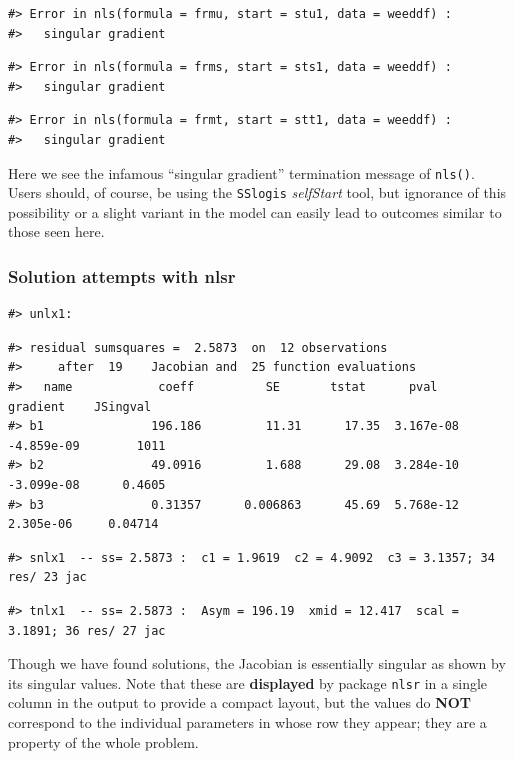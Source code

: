 \begin{verbatim}
#> Error in nls(formula = frmu, start = stu1, data = weeddf) : 
#>   singular gradient
\end{verbatim}

\begin{verbatim}
#> Error in nls(formula = frms, start = sts1, data = weeddf) : 
#>   singular gradient
\end{verbatim}

\begin{verbatim}
#> Error in nls(formula = frmt, start = stt1, data = weeddf) : 
#>   singular gradient
\end{verbatim}

Here we see the infamous ``singular gradient'' termination message of \texttt{nls()}.
Users should, of course, be using the \texttt{SSlogis} \emph{selfStart} tool, but ignorance
of this possibility or a slight variant in the model can easily lead to outcomes
similar to those seen here.

\subsubsection{Solution attempts with nlsr}\label{solution-attempts-with-nlsr}

\begin{verbatim}
#> unlx1:
\end{verbatim}

\begin{verbatim}
#> residual sumsquares =  2.5873  on  12 observations
#>     after  19    Jacobian and  25 function evaluations
#>   name            coeff          SE       tstat      pval      gradient    JSingval   
#> b1               196.186         11.31      17.35  3.167e-08  -4.859e-09        1011  
#> b2               49.0916         1.688      29.08  3.284e-10  -3.099e-08      0.4605  
#> b3               0.31357      0.006863      45.69  5.768e-12   2.305e-06     0.04714
\end{verbatim}

\begin{verbatim}
#> snlx1  -- ss= 2.5873 :  c1 = 1.9619  c2 = 4.9092  c3 = 3.1357; 34 res/ 23 jac
\end{verbatim}

\begin{verbatim}
#> tnlx1  -- ss= 2.5873 :  Asym = 196.19  xmid = 12.417  scal = 3.1891; 36 res/ 27 jac
\end{verbatim}

Though we have found solutions, the Jacobian is essentially singular as
shown by its singular
values. Note that these are \textbf{displayed} by package \texttt{nlsr} in a single column in
the output to provide a compact layout, but the values do \textbf{NOT} correspond to
the individual parameters in
whose row they appear; they are a property of the whole problem.

